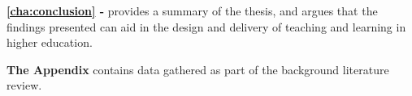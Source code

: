 \textbf{\cref{cha:conclusion} - } provides a summary of the thesis, and argues that the findings presented can aid in the design and delivery of teaching and learning in higher education. 

\textbf{The Appendix} contains data gathered as part of the background literature review.




